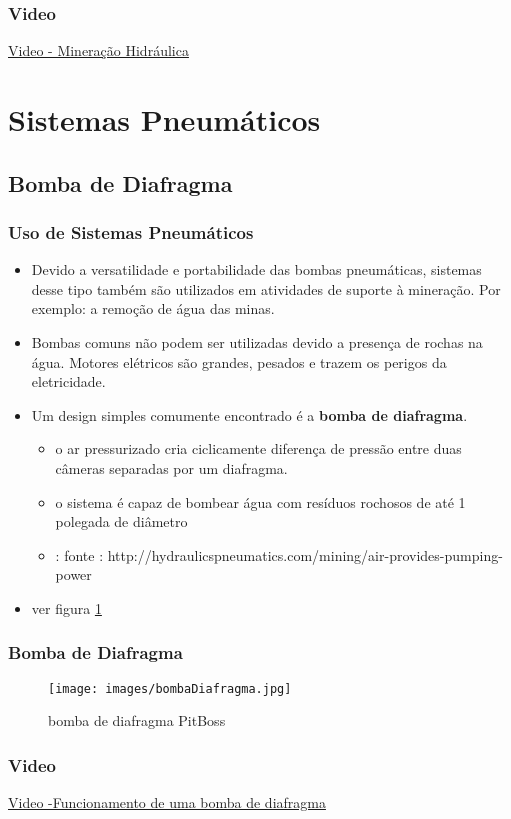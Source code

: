 \documentclass{beamer}
\begin{document}
\begin{frame}
	\frametitle{Video}
\href{https://www.youtube.com/watch?v=ac45MKG0m7M}{Video - Mineração Hidráulica}
\end{frame}

\section{Sistemas Pneumáticos}
\subsection{Bomba de Diafragma}
\begin{frame}
	\frametitle{Uso de Sistemas Pneumáticos}
    \begin{itemize}
        \item Devido a versatilidade e portabilidade das bombas pneumáticas, sistemas desse tipo também são utilizados em atividades de suporte à mineração. Por exemplo: a remoção de água das minas.
        \item Bombas comuns não podem ser utilizadas devido a presença de rochas na água. Motores elétricos são grandes, pesados e trazem os perigos da eletricidade. 
        \item Um design simples comumente encontrado é a \textbf{bomba de diafragma}. 
        \begin{itemize}
            \item o ar pressurizado cria ciclicamente diferença de pressão entre duas câmeras separadas por um diafragma.
            \item o sistema é capaz de bombear água com resíduos rochosos de até 1 polegada de diâmetro
            \item: fonte : http://hydraulicspneumatics.com/mining/air-provides-pumping-power
        \end{itemize}
        \item ver figura \ref{fig:bombaDiafragma}
    \end{itemize}
\end{frame}

\begin{frame}
	\frametitle{Bomba de Diafragma}
\begin{figure}
    	\centering
    	\texttt{[image: images/bombaDiafragma.jpg]}
		\caption{bomba de diafragma PitBoss}
		\label{fig:bombaDiafragma}
    \end{figure}
\end{frame}

\begin{frame}
	\frametitle{Video}
\href{https://www.youtube.com/watch?v=DuC5mmkArrc}{ Video -Funcionamento de uma bomba de diafragma}
\end{frame}
\end{document}
